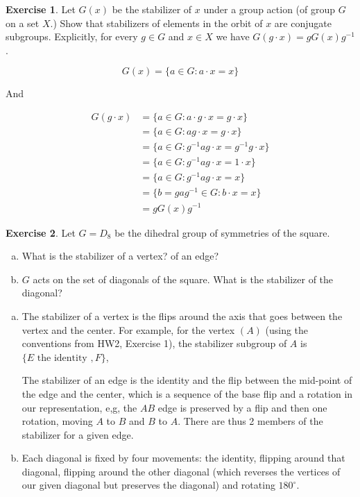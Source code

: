 \documentclass[11pt,oneside]{article}
\numberwithin{equation}{section}
\theoremstyle{definition}
\newtheorem{exercise}{Exercise}
\begin{document}
\begin{exercise}
  Let $G(x)$ be the stabilizer of $x$ under a group action (of group $G$ on a set $X$.) Show
  that stabilizers of elements in the orbit of $x$ are conjugate subgroups. Explicitly, for
  every $g \in G$ and $x \in X$ we have $G(g \cdot x) = gG(x)g^{-1}$.
\end{exercise}
\begin{solution}

  \[ 
  G(x) = \{ a \in G : a \cdot x = x \}
  \]

  And
  
  \begin{align*}
    G(g \cdot x) &= \{ a \in G : a \cdot g \cdot x = g \cdot x \} \\
    &= \{ a \in G : ag \cdot x = g \cdot x \} \\
    &= \{ a \in G : g^{-1}ag \cdot x = g^{-1}g \cdot x \} \\
    &= \{ a \in G : g^{-1}ag \cdot x = 1 \cdot x \} \\
    &= \{ a \in G : g^{-1}ag \cdot x = x \} \\
    &= \{ b = ga g^{-1}  \in G : b \cdot x = x \} \\
    &= g G(x) g^{-1}
  \end{align*}

  
\end{solution}

\begin{exercise}
  Let $G = D_8$ be the dihedral group of symmetries of the square.
  \begin{enumerate}[(a)]
    \item 
      What is the stabilizer of a vertex?  of an edge?
    \item
      $G$ acts on the set of diagonals of the square.  What is the stabilizer of the diagonal?
  \end{enumerate}
\end{exercise}
\begin{solution}
  \begin{enumerate}[(a)]
    \item 
      The stabilizer of a vertex is the flips around the axis that
      goes between the vertex and the center.  For example, for the
      vertex $(A)$ (using the conventions from HW2, Exercise 1), the
      stabilizer subgroup of $A$ is $\{E \textrm{ the identity }, F \}$,

      The stabilizer of an edge is the identity and the flip between
      the mid-point of the edge and the center, which is a sequence of
      the base flip and a rotation in our representation, e,g, the
      $AB$ edge is preserved by a flip and then one rotation, moving
      $A$ to $B$ and $B$ to $A$.  There are thus 2 members of the
      stabilizer for a given edge.
    \item
      Each diagonal is fixed by four movements: the identity, flipping
      around that diagonal, flipping around the other diagonal (which
      reverses the vertices of our given diagonal but preserves the
      diagonal) and rotating $180^{\circ}$.  
  \end{enumerate}
  
\end{solution}
\end{document}
